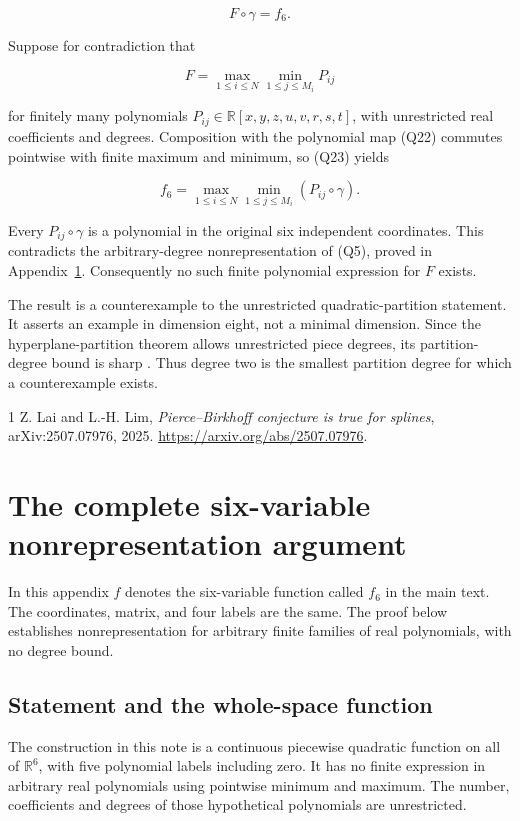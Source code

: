 \documentclass[11pt]{article}
\begin{document}
\[
F\circ\gamma=f_6.
\tag{Q23}
\]

Suppose for contradiction that

\[
F=\max_{1\le i\le N}\min_{1\le j\le M_i}P_{ij}
\]

for finitely many polynomials
\(P_{ij}\in\mathbb R[x,y,z,u,v,r,s,t]\), with unrestricted real
coefficients and degrees. Composition with the polynomial map (Q22)
commutes pointwise with finite maximum and minimum, so (Q23) yields

\[
f_6=\max_{1\le i\le N}\min_{1\le j\le M_i}(P_{ij}\circ\gamma).
\]

Every \(P_{ij}\circ\gamma\) is a polynomial in the original six
independent coordinates. This contradicts the arbitrary-degree nonrepresentation of (Q5), proved in Appendix~\ref{app:base}. Consequently no such finite
polynomial expression for \(F\) exists.

The result is a counterexample to the unrestricted quadratic-partition
statement. It asserts an example in dimension eight, not a minimal
dimension. Since the hyperplane-partition theorem allows unrestricted
piece degrees, its partition-degree bound is sharp \cite{LaiLim}. Thus degree two is the smallest partition degree
for which a counterexample exists.


\begin{thebibliography}{1}
 Z. Lai and L.-H. Lim,
\emph{Pierce--Birkhoff conjecture is true for splines},
arXiv:2507.07976, 2025.
\url{https://arxiv.org/abs/2507.07976}.
\end{thebibliography}
\clearpage
\appendix
\section{The complete six-variable nonrepresentation argument}
\label{app:base}
In this appendix $f$ denotes the six-variable function called $f_6$
in the main text. The coordinates, matrix, and four labels are the same.
The proof below establishes nonrepresentation for arbitrary finite
families of real polynomials, with no degree bound.
\subsection{Statement and the whole-space function}

The construction in this note is a continuous piecewise quadratic function on
all of \(\mathbb R^6\), with five polynomial labels including zero. It has no
finite expression in arbitrary real polynomials using pointwise minimum and
maximum. The number, coefficients and degrees of those hypothetical
polynomials are unrestricted. 
\end{document}
